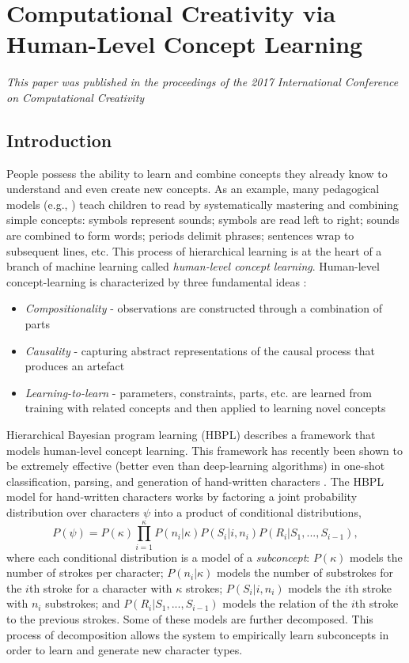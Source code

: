\documentclass[phd,electronic,oneside,twosidetoc,letterpaper,chaptercenter,parttop,lol,lof,lot]{byumsphd}
\begin{document}
\chapter{Computational Creativity via Human-Level Concept Learning}

\emph{This paper was published in the proceedings of the 2017 International Conference on Computational Creativity}

\section{Introduction}

People possess the ability to learn and combine concepts they already know to understand and even create new concepts. As an example, many pedagogical models (e.g., \cite{englemann1974distar}) teach children to read by systematically mastering and combining simple concepts: symbols represent sounds; symbols are read left to right; sounds are combined to form words; periods delimit phrases; sentences wrap to subsequent lines, etc. This process of hierarchical learning is at the heart of a branch of machine learning called \textit{human-level concept learning}. Human-level concept-learning is characterized by three fundamental ideas \cite{lake2015human}:

\begin{itemize}  
\item \emph{Compositionality} - observations are constructed through a combination of parts
\item \emph{Causality} - capturing abstract representations of the causal process that produces an artefact
\item \emph{Learning-to-learn} - parameters, constraints, parts, etc. are learned from training with related concepts and then applied to learning novel concepts
\end{itemize}

Hierarchical Bayesian program learning (HBPL) describes a framework that models human-level concept learning. This framework has recently been shown to be extremely effective (better even than deep-learning algorithms) in one-shot classification, parsing, and generation of hand-written characters \cite{lake2015human}. The HBPL model for hand-written characters works by factoring a joint probability distribution over characters $\psi$ into a product of conditional distributions,
\small
\begin{equation} \label{eq:1}
P(\psi) = P(\kappa) \prod_{i=1}^{\kappa} P(n_i|\kappa)P(S_i|i,n_i)P(R_i|S_1, ..., S_{i-1}),
\end{equation}
\normalsize
\noindent where each conditional distribution is a model of a \textit{subconcept}: \( P(\kappa) \) models the number of strokes per character; \( P(n_i|\kappa) \) models the number of substrokes for the $i$th stroke for a character with $\kappa$ strokes; \( P(S_i|i,n_i) \) models the $i$th stroke with $n_i$ substrokes; and \( P(R_i|S_1, ..., S_{i-1}) \) models the relation of the $i$th stroke to the previous strokes. Some of these models are further decomposed. This process of decomposition allows the system to empirically learn subconcepts in order to learn and generate new character types.
\end{document}
